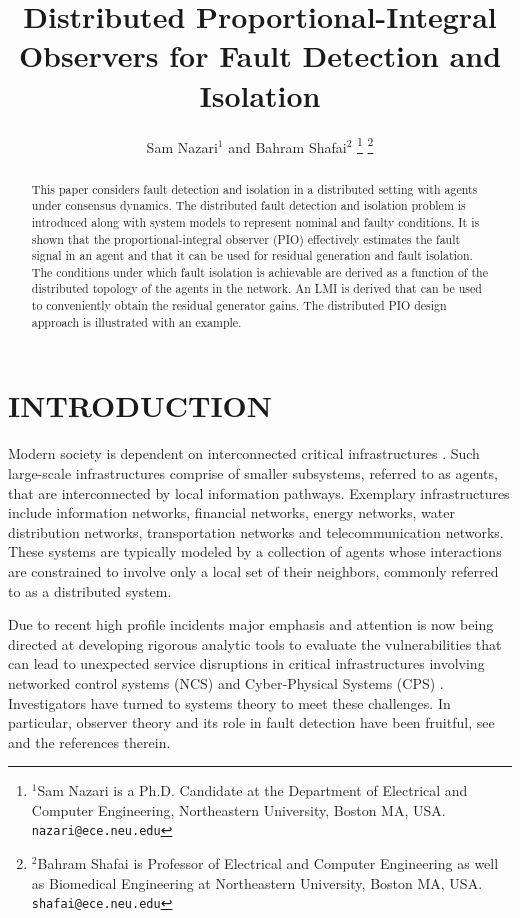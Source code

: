 \documentclass[letterpaper, 11 pt, conference]{ieeeconf}  %
\title{\Large \bf Distributed Proportional-Integral Observers for Fault Detection and Isolation
}
\author{Sam Nazari$^{1}$ and Bahram Shafai$^{2}$%
\thanks{$^{1}$Sam Nazari is a Ph.D. Candidate at the Department of Electrical and Computer Engineering,
        Northeastern University, Boston MA, USA. 
        {\tt\small nazari@ece.neu.edu}}%
\thanks{$^{2}$Bahram Shafai is Professor of Electrical and Computer Engineering as well as Biomedical Engineering at Northeastern University, Boston MA, USA.
		{\tt\small shafai@ece.neu.edu}}%
}
\begin{document}
\maketitle
\thispagestyle{empty}
\pagestyle{empty}


\begin{abstract}
This paper considers fault detection and isolation in a distributed setting with agents under consensus dynamics. The distributed fault detection and isolation problem is introduced along with system models to represent nominal and faulty conditions. It is shown that the proportional-integral observer (PIO) effectively estimates the fault signal in an agent and that it can be used for residual generation and fault isolation. The conditions under which fault isolation is achievable are derived as a function of the distributed topology of the agents in the network. An LMI is derived that can be used to conveniently obtain the residual generator gains. The distributed PIO design approach is illustrated with an example. 
\end{abstract}


\section{INTRODUCTION} \label{sec:intro}
Modern society is dependent on interconnected critical infrastructures \cite{teixeira_distributed_2014}. Such large-scale infrastructures comprise of smaller subsystems, referred to as agents, that are interconnected by local information pathways.  Exemplary infrastructures include information networks, financial networks, energy networks, water distribution networks, transportation networks and telecommunication networks. These systems are typically modeled by a collection of agents whose interactions are constrained to involve only a local set of their neighbors, commonly referred to as a distributed system.    

\medskip

Due to recent high profile incidents major emphasis and attention is now being directed at developing rigorous analytic tools to evaluate the vulnerabilities that can lead to unexpected service disruptions in critical infrastructures involving networked control systems (NCS) and Cyber-Physical Systems (CPS) \cite{pasqualetti_control-theoretic_2015,nazari_distributed_2016,teixeira_distributed_2014}. Investigators have turned to systems theory to meet these challenges. In particular, observer theory and its role in fault detection have been fruitful, see \cite{teixeira_distributed_2014} and the references therein. 
\end{document}
